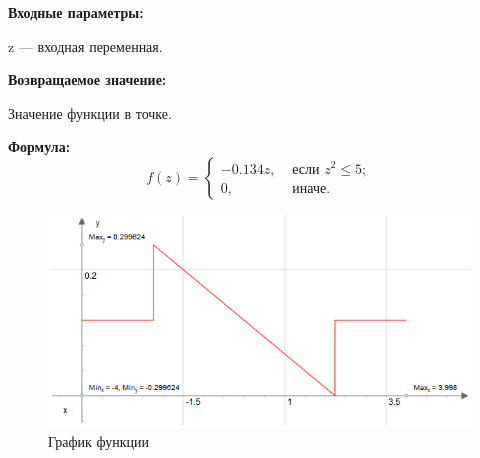 \textbf{Входные параметры:}
 
z --- входная переменная.

\textbf{Возвращаемое значение:}
 
Значение функции в точке.

\textbf{Формула:}
\begin{equation*}
f\left(z \right)=\left\lbrace \begin{aligned} -0.134z,& \text{ если } z^2\leq 5 ; \\ 0,& \text{ иначе}. \end{aligned}\right.
\end{equation*}

 \begin{figure} [h] 
   \center
   \includegraphics {MHL_DerivativeOfBellShapedKernelParabola_Graph.png}
   \caption{График функции} 
   \label{img:MHL_DerivativeOfBellShapedKernelParabola_Graph}  
 \end{figure}